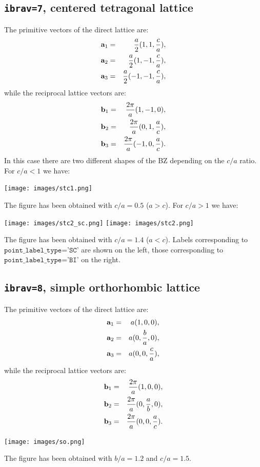 \documentclass[12pt,a4paper]{article}
\begin{document}
\subsection{\texttt{ibrav=7}, centered tetragonal lattice}
The primitive vectors of the direct lattice are:
\begin{eqnarray}
{\bf a}_1 &=& {a \over 2} (1, 1, {c\over a}), \nonumber \\
{\bf a}_2 &=& {a \over 2} (1, -1, {c\over a}), \nonumber \\
{\bf a}_3 &=& {a \over 2} (-1, -1, {c\over a}), \nonumber
\nonumber
\end{eqnarray}
while the reciprocal lattice vectors are:
\begin{eqnarray}
{\bf b}_1 &=& {2\pi \over a} (1, -1, 0), \nonumber \\
{\bf b}_2 &=& {2\pi \over a} (0, 1, {a\over c}), \nonumber \\
{\bf b}_3 &=& {2\pi \over a} (-1, 0, {a\over c}). \nonumber
\nonumber
\end{eqnarray}
In this case there are two different shapes of the BZ depending on the
$c/a$ ratio. For $c/a<1$ we have:
\begin{center}
\texttt{[image: images/stc1.png]}
\end{center}
The figure has been obtained with $c/a=0.5$ ($a>c$). For $c/a>1$ we have:
\begin{center}
\texttt{[image: images/stc2\_sc.png]} \hspace{1cm}
\texttt{[image: images/stc2.png]}
\end{center}
The figure has been obtained with $c/a=1.4$ ($a<c$).
Labels corresponding to $\texttt{point\_label\_type='SC'}$ are shown on the left,
those corresponding to $\texttt{point\_label\_type='BI'}$ on the right.

\subsection{\texttt{ibrav=8}, simple orthorhombic lattice}
The primitive vectors of the direct lattice are:
\begin{eqnarray}
{\bf a}_1 &=& a (1, 0, 0), \nonumber \\
{\bf a}_2 &=& a (0, {b\over a}, 0), \nonumber \\
{\bf a}_3 &=& a (0, 0, {c\over a}), \nonumber
\nonumber
\end{eqnarray}
while the reciprocal lattice vectors are:
\begin{eqnarray}
{\bf b}_1 &=& {2\pi \over a} (1, 0, 0), \nonumber \\
{\bf b}_2 &=& {2\pi \over a} (0, {a\over b}, 0), \nonumber \\
{\bf b}_3 &=& {2\pi \over a} (0, 0, {a\over c}). \nonumber
\nonumber
\end{eqnarray}
\begin{center}
\texttt{[image: images/so.png]}
\end{center}
The figure has been obtained with $b/a=1.2$ and $c/a=1.5$.
\end{document}
